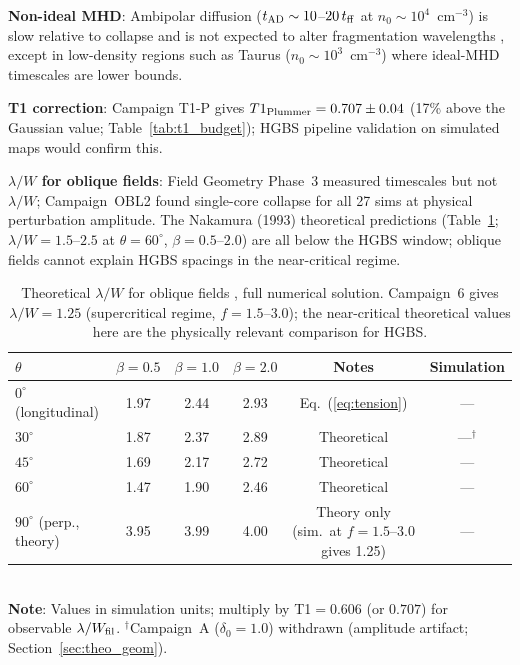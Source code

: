\documentclass[twoside,twocolumn]{mnras}
\begin{document}
\textbf{Non-ideal MHD}: Ambipolar diffusion ($t_{\rm AD} \sim 10$--$20\,t_{\rm ff}$ at
$n_0 \sim 10^4$~cm$^{-3}$) is slow relative to collapse and is not expected to alter
fragmentation wavelengths \citep{Nakamura2005, Tassis2004}, except in low-density regions
such as Taurus ($n_0 \sim 10^3$~cm$^{-3}$) where ideal-MHD timescales are lower bounds.

\textbf{T1 correction}: Campaign T1-P gives $T1_{\rm Plummer} = 0.707 \pm 0.04$ (17\% above the Gaussian value; Table~\ref{tab:t1_budget}); HGBS pipeline validation on simulated maps would confirm this.

\textbf{$\lambda/W$ for oblique fields}: Field Geometry Phase~3 measured timescales
but not $\lambda/W$; Campaign~OBL2 found single-core collapse for all 27 sims at
physical perturbation amplitude. The Nakamura (1993) theoretical predictions
(Table~\ref{tab:oblique_theory}; $\lambda/W = 1.5$--$2.5$ at $\theta = 60^\circ$, $\beta = 0.5$--$2.0$)
are all below the HGBS window; oblique fields cannot explain HGBS spacings in the
near-critical regime.

\begin{table}
\caption{Theoretical $\lambda/W$ for oblique fields \citep{Nakamura1993}, full numerical
solution. Campaign~6 gives $\lambda/W=1.25$ (supercritical regime, $f=1.5$--$3.0$); the
near-critical theoretical values here are the physically relevant comparison for HGBS.}
\label{tab:oblique_theory}
\small
\begin{tabular}{lccccc}
\toprule
$\theta$ & $\beta=0.5$ & $\beta=1.0$ & $\beta=2.0$ & Notes & Simulation \\
\midrule
$0^\circ$ (longitudinal) & 1.97 & 2.44 & 2.93 & Eq.~(\ref{eq:tension}) & --- \\
$30^\circ$ & 1.87 & 2.37 & 2.89 & Theoretical & ---$^\dagger$ \\
$45^\circ$ & 1.69 & 2.17 & 2.72 & Theoretical & --- \\
$60^\circ$ & 1.47 & 1.90 & 2.46 & Theoretical & --- \\
$90^\circ$ (perp., theory) & 3.95 & 3.99 & 4.00 & Theory only (sim.\ at $f=1.5$--$3.0$ gives 1.25) & --- \\
\bottomrule
\end{tabular}
\\ \footnotesize \textbf{Note}: Values in simulation units; multiply by T1$=0.606$ (or $0.707$) for observable $\lambda/W_{\rm fil}$. $^\dagger$Campaign~A ($\delta_0=1.0$) withdrawn (amplitude artifact; Section~\ref{sec:theo_geom}).
\end{table}
\end{document}
